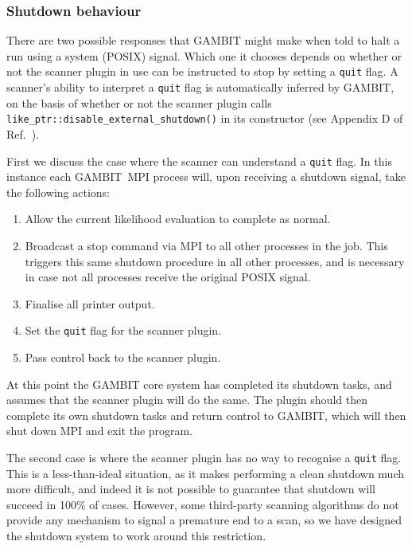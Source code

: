 \documentclass[pdftex,twocolumn,epjc3_preprint,runningheads]{svjour3}
\renewcommand{\_}{\discretionary{\underscore}{}{\underscore}}
\newcommand\cpp[1]{{\lstinline!#1!}}  %
\newcommand{\gambit}{\textsf{GAMBIT}\xspace}
\newcommand{\GB}{\gambit}
\newcommand{\mpi}{\textsf{MPI}\xspace}
\newcommand{\posix}{\textsf{POSIX}\xspace}
\begin{document}
\subsubsection{Shutdown behaviour}

There are two possible responses that \GB might make when told to halt a run using a system (\posix) signal. Which one it chooses depends on whether or not the scanner plugin in use can be instructed to stop by setting a \cpp{quit} flag.  A scanner's ability to interpret a \cpp{quit} flag is automatically inferred by \GB, on the basis of whether or not the scanner plugin calls \cpp{like_ptr::disable_external_shutdown()} in its constructor (see Appendix D of Ref.~\cite{ScannerBit}).

First we discuss the case where the scanner can understand a \cpp{quit} flag. In this instance each \GB\ \mpi process will, upon receiving a shutdown signal, take the following actions:
\begin{enumerate}
\item Allow the current likelihood evaluation to complete as normal.
\item Broadcast a stop command via \mpi to all other processes in the job.  This triggers this same shutdown procedure in all other processes, and is necessary in case not all processes receive the original \posix signal.
\item Finalise all printer output.
\item Set the \cpp{quit} flag for the scanner plugin.
\item Pass control back to the scanner plugin.
\end{enumerate}
At this point the \GB core system has completed its shutdown tasks, and assumes that the scanner plugin will do the same. The plugin should then complete its own shutdown tasks and return control to \GB, which will then shut down \mpi and exit the program.

The second case is where the scanner plugin has no way to recognise a \cpp{quit} flag. This is a less-than-ideal situation, as it makes performing a clean shutdown much more difficult, and indeed it is not possible to guarantee that shutdown will succeed in 100\% of cases. However, some third-party scanning algorithms do not provide any mechanism to signal a premature end to a scan, so we have designed the shutdown system to work around this restriction.
\end{document}
